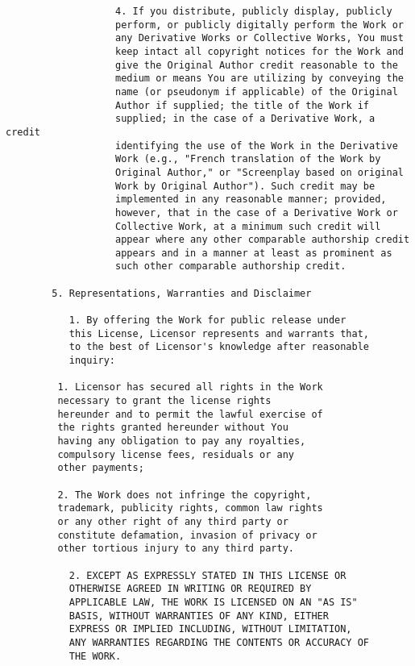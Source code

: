 \begin{verbatim}
                   4. If you distribute, publicly display, publicly
                   perform, or publicly digitally perform the Work or
                   any Derivative Works or Collective Works, You must
                   keep intact all copyright notices for the Work and
                   give the Original Author credit reasonable to the
                   medium or means You are utilizing by conveying the
                   name (or pseudonym if applicable) of the Original
                   Author if supplied; the title of the Work if
                   supplied; in the case of a Derivative Work, a credit
                   identifying the use of the Work in the Derivative
                   Work (e.g., "French translation of the Work by
                   Original Author," or "Screenplay based on original
                   Work by Original Author"). Such credit may be
                   implemented in any reasonable manner; provided,
                   however, that in the case of a Derivative Work or
                   Collective Work, at a minimum such credit will
                   appear where any other comparable authorship credit
                   appears and in a manner at least as prominent as
                   such other comparable authorship credit.

        5. Representations, Warranties and Disclaimer

           1. By offering the Work for public release under
           this License, Licensor represents and warrants that,
           to the best of Licensor's knowledge after reasonable
           inquiry:

         1. Licensor has secured all rights in the Work
         necessary to grant the license rights
         hereunder and to permit the lawful exercise of
         the rights granted hereunder without You
         having any obligation to pay any royalties,
         compulsory license fees, residuals or any
         other payments;

         2. The Work does not infringe the copyright,
         trademark, publicity rights, common law rights
         or any other right of any third party or
         constitute defamation, invasion of privacy or
         other tortious injury to any third party.

           2. EXCEPT AS EXPRESSLY STATED IN THIS LICENSE OR
           OTHERWISE AGREED IN WRITING OR REQUIRED BY
           APPLICABLE LAW, THE WORK IS LICENSED ON AN "AS IS"
           BASIS, WITHOUT WARRANTIES OF ANY KIND, EITHER
           EXPRESS OR IMPLIED INCLUDING, WITHOUT LIMITATION,
           ANY WARRANTIES REGARDING THE CONTENTS OR ACCURACY OF
           THE WORK.


\end{verbatim}
